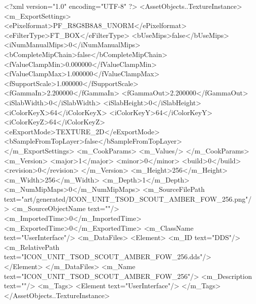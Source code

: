 <?xml version="1.0" encoding="UTF-8" ?>
<AssetObjects..TextureInstance>
	<m_ExportSettings>
		<ePixelformat>PF_R8G8B8A8_UNORM</ePixelformat>
		<eFilterType>FT_BOX</eFilterType>
		<bUseMips>false</bUseMips>
		<iNumManualMips>0</iNumManualMips>
		<bCompleteMipChain>false</bCompleteMipChain>
		<fValueClampMin>0.000000</fValueClampMin>
		<fValueClampMax>1.000000</fValueClampMax>
		<fSupportScale>1.000000</fSupportScale>
		<fGammaIn>2.200000</fGammaIn>
		<fGammaOut>2.200000</fGammaOut>
		<iSlabWidth>0</iSlabWidth>
		<iSlabHeight>0</iSlabHeight>
		<iColorKeyX>64</iColorKeyX>
		<iColorKeyY>64</iColorKeyY>
		<iColorKeyZ>64</iColorKeyZ>
		<eExportMode>TEXTURE_2D</eExportMode>
		<bSampleFromTopLayer>false</bSampleFromTopLayer>
	</m_ExportSettings>
	<m_CookParams>
		<m_Values/>
	</m_CookParams>
	<m_Version>
		<major>1</major>
		<minor>0</minor>
		<build>0</build>
		<revision>0</revision>
	</m_Version>
	<m_Height>256</m_Height>
	<m_Width>256</m_Width>
	<m_Depth>1</m_Depth>
	<m_NumMipMaps>0</m_NumMipMaps>
	<m_SourceFilePath text="art/generated/ICON_UNIT_TSOD_SCOUT_AMBER_FOW_256.png"/>
	<m_SourceObjectName text=""/>
	<m_ImportedTime>0</m_ImportedTime>
	<m_ExportedTime>0</m_ExportedTime>
	<m_ClassName text="UserInterface"/>
	<m_DataFiles>
		<Element>
			<m_ID text="DDS"/>
			<m_RelativePath text="ICON_UNIT_TSOD_SCOUT_AMBER_FOW_256.dds"/>
		</Element>
	</m_DataFiles>
	<m_Name text="ICON_UNIT_TSOD_SCOUT_AMBER_FOW_256"/>
	<m_Description text=""/>
	<m_Tags>
		<Element text="UserInterface"/>
	</m_Tags>
</AssetObjects..TextureInstance>
